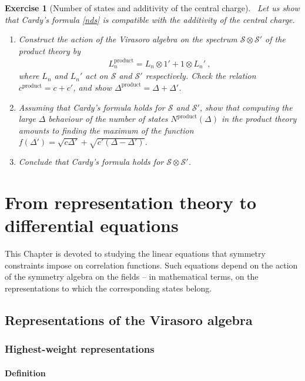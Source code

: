 \documentclass[12pt, a4paper, notitlepage, twoside]{report}
\numberwithin{equation}{section}
\theoremstyle{break}
\newtheorem{exo}{Exercise}[chapter]
\begin{document}
\begin{exo}[Number of states and additivity of the central charge]
 ~\label{exoacf} 
Let us show that Cardy's formula \eqref{nds} is compatible with the additivity of the central charge.
\begin{enumerate}
 \item Construct the action of the Virasoro algebra on the spectrum $\mathcal{S}\otimes \mathcal{S}'$ of the product theory by 
\begin{align}
 L_n^\text{product} = L_n\otimes 1' + 1\otimes L_n'\ ,
\end{align}
where $L_n$ and $L_n'$ act on $\mathcal{S}$ and $\mathcal{S}'$ respectively.
Check the relation $c^\text{product} = c+c'$, and show $\Delta^\text{product} = \Delta+\Delta'$.
\item 
Assuming that Cardy's formula holds for $\mathcal{S}$ and $\mathcal{S}'$, show that computing the large $\Delta$ behaviour of the number of states $N^\text{product}(\Delta)$ in the product theory amounts to finding the maximum of the function $f(\Delta') = \sqrt{c\Delta'} +\sqrt{c'(\Delta-\Delta')}$.
\item
Conclude that Cardy's formula holds for $\mathcal{S}\otimes \mathcal{S}'$.
\end{enumerate}
\end{exo}



\chapter{From representation theory to differential equations \label{secccs}}

This Chapter is devoted to studying the linear equations that symmetry constraints impose on correlation functions.
Such equations depend on the action of the symmetry algebra on the fields -- in mathematical terms, on the representations to which the corresponding states belong. 

\section{Representations of the Virasoro algebra \label{secrep}}

\subsection{Highest-weight representations}

\subsubsection{Definition}
\end{document}
